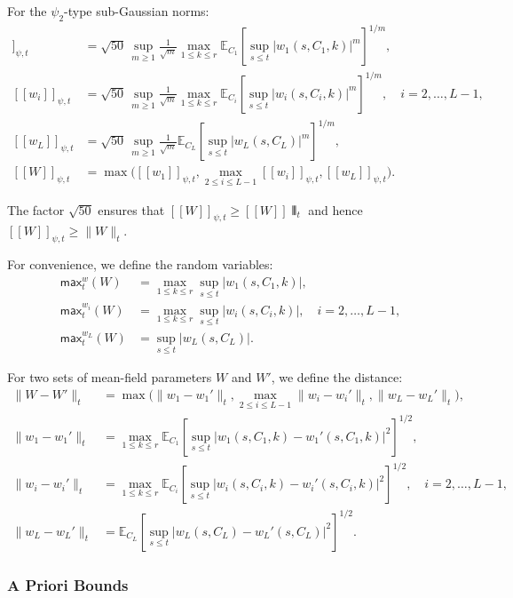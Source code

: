 \documentclass[11pt]{article}
\newcommand{\E}{\mathbb{E}}
\newcommand{\1}{\mathbbm{1}}
\newcommand{\llbracket}{[\![}
\newcommand{\rrbracket}{]\!]}
\newcommand{\interleave}[1]{\llbracket #1 \rrbracket}
\begin{document}
For the $\psi_2$-type sub-Gaussian norms:
\begin{align*}
\llbracket w_1\rrbracket_{\psi,t} &= \sqrt{50}\,\sup_{m\ge 1}\frac{1}{\sqrt{m}}\max_{1\le k\le r}\E_{C_1}\!\left[\sup_{s\le t}|w_1(s,C_1,k)|^m\right]^{1/m},\\
\llbracket w_i\rrbracket_{\psi,t} &= \sqrt{50}\,\sup_{m\ge 1}\frac{1}{\sqrt{m}}\max_{1\le k\le r}\E_{C_i}\!\left[\sup_{s\le t}|w_i(s,C_i,k)|^m\right]^{1/m}, \quad i=2,\ldots,L-1,\\
\llbracket w_L\rrbracket_{\psi,t} &= \sqrt{50}\,\sup_{m\ge 1}\frac{1}{\sqrt{m}}\E_{C_L}\!\left[\sup_{s\le t}|w_L(s,C_L)|^m\right]^{1/m},\\
\llbracket W\rrbracket_{\psi,t} &= \max\big(\llbracket w_1\rrbracket_{\psi,t}, \max_{2\le i\le L-1}\llbracket w_i\rrbracket_{\psi,t}, \llbracket w_L\rrbracket_{\psi,t}\big).
\end{align*}

The factor $\sqrt{50}$ ensures that $\llbracket W\rrbracket_{\psi,t}\ge \interleave W\interleave_t$ and hence $\llbracket W\rrbracket_{\psi,t}\ge \|W\|_t$.

For convenience, we define the random variables:
\begin{align*}
\mathsf{max}_t^w(W) &= \max_{1\le k\le r}\sup_{s\le t}|w_1(s,C_1,k)|,\\
\mathsf{max}_t^{w_i}(W) &= \max_{1\le k\le r}\sup_{s\le t}|w_i(s,C_i,k)|, \quad i=2,\ldots,L-1,\\
\mathsf{max}_t^{w_L}(W) &= \sup_{s\le t}|w_L(s,C_L)|.
\end{align*}

For two sets of mean-field parameters $W$ and $W'$, we define the distance:
\begin{align}
\|W-W'\|_t &= \max\big(\|w_1-w_1'\|_t, \max_{2\le i\le L-1}\|w_i-w_i'\|_t, \|w_L-w_L'\|_t\big),\label{eq:def-MF-distance-app}\\
\|w_1-w_1'\|_t &= \max_{1\le k\le r}\E_{C_1}\!\left[\sup_{s\le t}|w_1(s,C_1,k)-w_1'(s,C_1,k)|^2\right]^{1/2},\nonumber\\
\|w_i-w_i'\|_t &= \max_{1\le k\le r}\E_{C_i}\!\left[\sup_{s\le t}|w_i(s,C_i,k)-w_i'(s,C_i,k)|^2\right]^{1/2}, \quad i=2,\ldots,L-1,\nonumber\\
\|w_L-w_L'\|_t &= \E_{C_L}\!\left[\sup_{s\le t}|w_L(s,C_L)-w_L'(s,C_L)|^2\right]^{1/2}.\nonumber
\end{align}

\subsubsection{A Priori Bounds}
\end{document}
